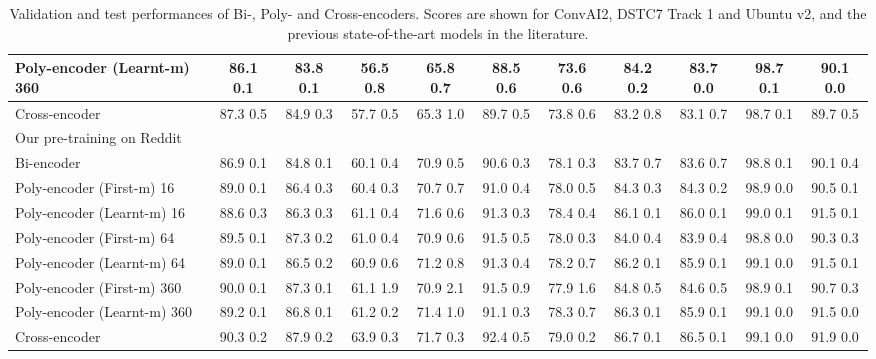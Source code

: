 \documentclass{article} \usepackage{iclr2020_conference,times}
\begin{document}
\begin{table*}[h]
{\begin{tabular}{|l|c|c|c|c|c|c|c|c|c|c|}
Poly-encoder (Learnt-m) 360 & 86.1  0.1 & 83.8  0.1 & 56.5  0.8 & 65.8  0.7 & 88.5  0.6 & 73.6  0.6 & 84.2  0.2 & 83.7  0.0 & 98.7  0.1 & 90.1  0.0\\ \hline 

Cross-encoder & 87.3  0.5 & 84.9  0.3 & 57.7  0.5 & 65.3  1.0 & 89.7  0.5 & 73.8  0.6 & 83.2  0.8 & 83.1  0.7 & 98.7  0.1 & 89.7  0.5\\ \hline 

\hline
 \multicolumn{11}{|l|}{Our pre-training on Reddit}  \\
 \hline
Bi-encoder & 86.9  0.1 & 84.8  0.1 & 60.1  0.4 & 70.9  0.5 & 90.6  0.3 & 78.1  0.3 & 83.7  0.7 & 83.6  0.7 & 98.8  0.1 & 90.1  0.4\\ \hline 

Poly-encoder (First-m) 16 & 89.0  0.1 & 86.4  0.3 & 60.4  0.3 & 70.7  0.7 & 91.0  0.4 & 78.0  0.5 & 84.3  0.3 & 84.3  0.2 & 98.9  0.0 & 90.5  0.1\\ \hline 

Poly-encoder (Learnt-m) 16 & 88.6  0.3 & 86.3  0.3 & 61.1  0.4 & 71.6  0.6 & 91.3  0.3 & 78.4  0.4 & 86.1  0.1 & 86.0  0.1 & 99.0  0.1 & 91.5  0.1\\ \hline 

Poly-encoder (First-m) 64 & 89.5  0.1 & 87.3  0.2 & 61.0  0.4 & 70.9  0.6 & 91.5  0.5 & 78.0  0.3 & 84.0  0.4 & 83.9  0.4 & 98.8  0.0 & 90.3  0.3\\ \hline 

Poly-encoder (Learnt-m) 64 & 89.0  0.1 & 86.5  0.2 & 60.9  0.6 & 71.2  0.8 & 91.3  0.4 & 78.2  0.7 & 86.2  0.1 & 85.9  0.1 & 99.1  0.0 & 91.5  0.1\\ \hline 

Poly-encoder (First-m) 360 & 90.0  0.1 & 87.3  0.1 & 61.1  1.9 & 70.9  2.1 & 91.5  0.9 & 77.9  1.6 & 84.8  0.5 & 84.6  0.5 & 98.9  0.1 & 90.7  0.3\\ \hline 

Poly-encoder (Learnt-m) 360 & 89.2  0.1 & 86.8  0.1 & 61.2  0.2 & 71.4  1.0 & 91.1  0.3 & 78.3  0.7 & 86.3  0.1 & 85.9  0.1 & 99.1  0.0 & 91.5  0.0\\ \hline 

Cross-encoder & 90.3  0.2& 87.9  0.2 & 63.9  0.3&  71.7  0.3&  92.4  0.5& 79.0  0.2 & 86.7  0.1&  86.5  0.1&99.1  0.0&  91.9  0.0\\ \hline 




\end{tabular}}
\caption{Validation and test performances of Bi-, Poly- and Cross-encoders. Scores are shown for ConvAI2, DSTC7 Track 1 and Ubuntu v2, and the previous state-of-the-art models in the literature.}
\label{table:best_scores_full}
\end{table*}
\end{document}
